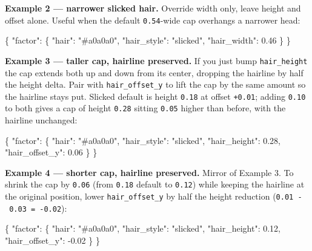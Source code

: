\documentclass[
  11pt,
]{book}
\newenvironment{Shaded}{}{}
\newcommand{\DataTypeTok}[1]{\textcolor[rgb]{0.56,0.13,0.00}{#1}}
\newcommand{\FloatTok}[1]{\textcolor[rgb]{0.25,0.63,0.44}{#1}}
\newcommand{\FunctionTok}[1]{\textcolor[rgb]{0.02,0.16,0.49}{#1}}
\newcommand{\OtherTok}[1]{\textcolor[rgb]{0.00,0.44,0.13}{#1}}
\newcommand{\StringTok}[1]{\textcolor[rgb]{0.25,0.44,0.63}{#1}}
\begin{document}
\textbf{Example 2 --- narrower slicked hair.} Override width only, leave
height and offset alone. Useful when the default \texttt{0.54}-wide cap
overhangs a narrower head:

\begin{Shaded}
\begin{Highlighting}[]
\FunctionTok{\{}
  \DataTypeTok{"factor"}\FunctionTok{:} \FunctionTok{\{}
    \DataTypeTok{"hair"}\FunctionTok{:}        \StringTok{"\#a0a0a0"}\FunctionTok{,}
    \DataTypeTok{"hair\_style"}\FunctionTok{:}  \StringTok{"slicked"}\FunctionTok{,}
    \DataTypeTok{"hair\_width"}\FunctionTok{:}  \FloatTok{0.46}
  \FunctionTok{\}}
\FunctionTok{\}}
\end{Highlighting}
\end{Shaded}

\textbf{Example 3 --- taller cap, hairline preserved.} If you just bump
\texttt{hair\_height} the cap extends both up and down from its center,
dropping the hairline by half the height delta. Pair with
\texttt{hair\_offset\_y} to lift the cap by the same amount so the
hairline stays put. Slicked default is height \texttt{0.18} at offset
\texttt{+0.01}; adding \texttt{0.10} to both gives a cap of height
\texttt{0.28} sitting \texttt{0.05} higher than before, with the
hairline unchanged:

\begin{Shaded}
\begin{Highlighting}[]
\FunctionTok{\{}
  \DataTypeTok{"factor"}\FunctionTok{:} \FunctionTok{\{}
    \DataTypeTok{"hair"}\FunctionTok{:}           \StringTok{"\#a0a0a0"}\FunctionTok{,}
    \DataTypeTok{"hair\_style"}\FunctionTok{:}     \StringTok{"slicked"}\FunctionTok{,}
    \DataTypeTok{"hair\_height"}\FunctionTok{:}    \FloatTok{0.28}\FunctionTok{,}
    \DataTypeTok{"hair\_offset\_y"}\FunctionTok{:}  \FloatTok{0.06}
  \FunctionTok{\}}
\FunctionTok{\}}
\end{Highlighting}
\end{Shaded}

\textbf{Example 4 --- shorter cap, hairline preserved.} Mirror of
Example 3. To shrink the cap by \texttt{0.06} (from \texttt{0.18}
default to \texttt{0.12}) while keeping the hairline at the original
position, lower \texttt{hair\_offset\_y} by half the height reduction
(\texttt{0.01\ -\ 0.03\ =\ -0.02}):

\begin{Shaded}
\begin{Highlighting}[]
\FunctionTok{\{}
  \DataTypeTok{"factor"}\FunctionTok{:} \FunctionTok{\{}
    \DataTypeTok{"hair"}\FunctionTok{:}           \StringTok{"\#a0a0a0"}\FunctionTok{,}
    \DataTypeTok{"hair\_style"}\FunctionTok{:}     \StringTok{"slicked"}\FunctionTok{,}
    \DataTypeTok{"hair\_height"}\FunctionTok{:}    \FloatTok{0.12}\FunctionTok{,}
    \DataTypeTok{"hair\_offset\_y"}\FunctionTok{:} \OtherTok{-}\FloatTok{0.02}
  \FunctionTok{\}}
\FunctionTok{\}}
\end{Highlighting}
\end{Shaded}
\end{document}

